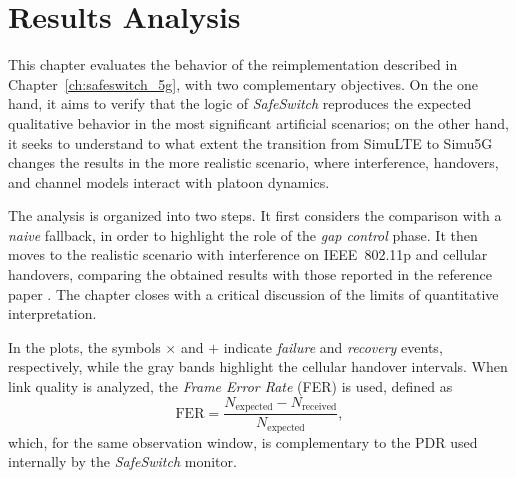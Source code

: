 \chapter{Results Analysis}
\label{ch:results}

This chapter evaluates the behavior of the reimplementation described in Chapter~\ref{ch:safeswitch_5g}, with two complementary objectives. On the one hand, it aims to verify that the logic of \emph{SafeSwitch} reproduces the expected qualitative behavior in the most significant artificial scenarios; on the other hand, it seeks to understand to what extent the transition from SimuLTE to Simu5G changes the results in the more realistic scenario, where interference, handovers, and channel models interact with platoon dynamics.

The analysis is organized into two steps. It first considers the comparison with a \emph{naive} fallback, in order to highlight the role of the \emph{gap control} phase. It then moves to the realistic scenario with interference on IEEE~802.11p and cellular handovers, comparing the obtained results with those reported in the reference paper \cite{segata2023multi-technology}. The chapter closes with a critical discussion of the limits of quantitative interpretation.

In the plots, the symbols \(\times\) and \(+\) indicate \emph{failure} and \emph{recovery} events, respectively, while the gray bands highlight the cellular handover intervals. When link quality is analyzed, the \emph{Frame Error Rate} (FER) is used, defined as
\[
\mathrm{FER} = \frac{N_{\mathrm{expected}} - N_{\mathrm{received}}}{N_{\mathrm{expected}}},
\]
which, for the same observation window, is complementary to the PDR used internally by the \emph{SafeSwitch} monitor.
